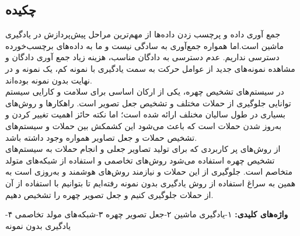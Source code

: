 
\setcounter{page}{1}
\thispagestyle{empty}


\subsection*{چکیده}
\begin{small}
    \baselineskip=0.7cm
    جمع آوری داده و پرچسب زدن داده‌ها از مهم‌ترین مراحل پیش‌پردازش در یادگیری ماشین است.اما همواره جمع‌آوری به سادگی نیست و ما به داده‌های برچسب‌خورده دسترسی نداریم. عدم دسترسی به دادگان مناسب، هزینه زیاد جمع آوری دادگان و مشاهده نمونه‌های جدید از عوامل حرکت به سمت یادگیری با نمونه کم، یک نمونه و در نهایت بدون نمونه بوده‌اند.
    \\
    در سیستم‌های تشخیص چهره، یکی از ارکان اساسی برای سلامت و کارایی سیستم توانایی جلوگیری از حملات مختلف و تشخیص جعل تصویر است. راهکارها و روش‌های بسیاری در طول سالیان مخنلف ارائه شده است؛ اما نکته حائز اهمیت تغییر کردن و به‌روز شدن حملات است که باعث می‌شود این کشمکش بین حملات و سیستم‌های تشخیص حملات و جعل تصاویر همواره وجود داشته باشد.
    \\
    از روش‌های پر کاربردی که برای تولید تصاویر جعلی و انجام حملات به سیستم‌های تشخیص چهره استفاده می‌شود روش‌های تخاصمی و استفاده از شبکه‌های متولد متخاصم است. جلوگیری از این حملات و نیازمند روش‌های هوشمند و به‌روزی است به همین به سراغ استفاده از روش یادگیری بدون نمونه رفته‌ایم تا بتوانیم با استفاده از آن از حملات جلوگیری کنیم و جعل تصویر چهره را تشخیص دهیم.

    \vspace*{0.5 cm}

    \noindent\textbf{واژه‌های کلیدی:}
    ۱-یادگیری ماشین  ۲-جعل تصویر چهره ۳-شبکه‌های مولد تخاصمی ۴-یادگیری بدون نمونه
\end{small}